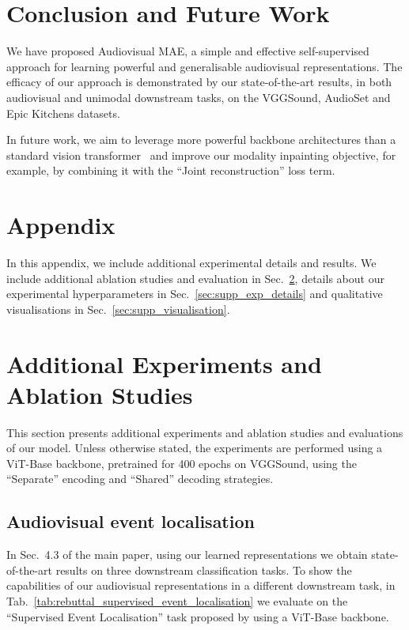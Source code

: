 \documentclass[10pt,twocolumn,letterpaper]{article}
\begin{document}
\section{Conclusion and Future Work}
\vspace{-1mm}

We have proposed Audiovisual MAE,
a simple and effective self-supervised approach for learning powerful and generalisable audiovisual representations.
The efficacy of our approach is demonstrated by our state-of-the-art results, in both audiovisual and unimodal downstream tasks, on the VGGSound, AudioSet and Epic Kitchens datasets.

In future work, we aim to leverage more powerful backbone architectures than a standard vision transformer~\cite{dosovitskiy_iclr_2021} and improve our modality inpainting objective, for example, by combining it with the ``Joint reconstruction'' loss term.

 

{\small


}

\clearpage

\section*{Appendix}

\appendix

In this appendix, we include additional experimental details and results.
We include additional ablation studies and evaluation in Sec.~\ref{sec:supp_ablations}, details about our experimental hyperparameters in Sec.~\ref{sec:supp_exp_details} and qualitative visualisations in Sec.~\ref{sec:supp_visualisation}.

\section{Additional Experiments and Ablation Studies}
\label{sec:supp_ablations}

This section presents additional experiments and ablation studies and evaluations of our model.
Unless otherwise stated, the experiments are performed using a ViT-Base backbone, pretrained for 400 epochs on VGGSound, using the ``Separate'' encoding and ``Shared'' decoding strategies.

\subsection{Audiovisual event localisation}
In Sec.~4.3 of the main paper, using our learned representations we obtain state-of-the-art results on three downstream classification tasks. 
To show the capabilities of our audiovisual representations in a different downstream task, in Tab.~\ref{tab:rebuttal_supervised_event_localisation} we evaluate on the ``Supervised Event Localisation'' task proposed by \cite{tian2018audio} using a ViT-Base backbone.
\end{document}
